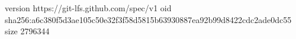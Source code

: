 version https://git-lfs.github.com/spec/v1
oid sha256:a6c380f5d3ae105c50e32f3f58d5815b63930887ea92b99d8422cdc2ade0dc55
size 2796344
